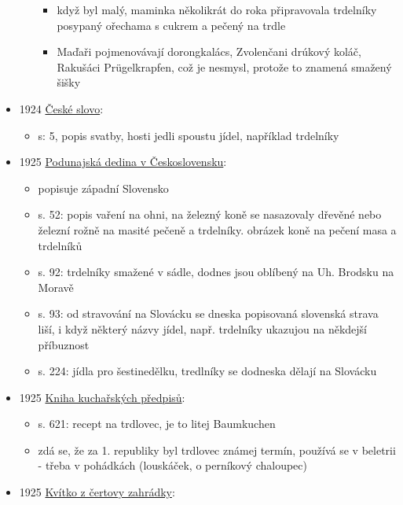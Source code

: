 \begin{itemize}
\begin{itemize}
    \begin{itemize}
    \tightlist
    \item
      když byl malý, maminka několikrát do roka připravovala trdelníky
      posypaný ořechama s cukrem a pečený na trdle
    \item
      Maďaři pojmenovávají dorongkalács, Zvolenčani drúkový koláč,
      Rakušáci Prügelkrapfen, což je nesmysl, protože to znamená smažený
      šišky
    \end{itemize}
  \end{itemize}
\item
  1924
  \href{https://ceskadigitalniknihovna.cz/uuid/uuid:a382bc3a-7825-4663-992a-f6e93b38a656}{České
  slovo}:

  \begin{itemize}
  \tightlist
  \item
    s: 5, popis svatby, hosti jedli spoustu jídel, například trdelníky
  \end{itemize}
\item
  1925
  \href{https://www.digitalniknihovna.cz/nulk/uuid/uuid:b2d75327-ce5f-4248-8ec5-52b0f9b2f9af}{Podunajská
  dedina v Československu}:

  \begin{itemize}
  \tightlist
  \item
    popisuje západní Slovensko
  \item
    s. 52: popis vaření na ohni, na železný koně se nasazovaly dřevěné
    nebo železní rožně na masité pečeně a trdelníky. obrázek koně na
    pečení masa a trdelníků
  \item
    s. 92: trdelníky smažené v sádle, dodnes jsou oblíbený na Uh.
    Brodsku na Moravě
  \item
    s. 93: od stravování na Slovácku se dneska popisovaná slovenská
    strava liší, i když některý názvy jídel, např. trdelníky ukazujou na
    někdejší příbuznost
  \item
    s. 224: jídla pro šestinedělku, tredlníky se dodneska dělají na
    Slovácku
  \end{itemize}
\item
  1925
  \href{https://ceskadigitalniknihovna.cz/uuid/uuid:fc3b3470-0163-11ea-af21-005056827e52}{Kniha
  kuchařských předpisů}:

  \begin{itemize}
  \tightlist
  \item
    s. 621: recept na trdlovec, je to litej Baumkuchen
  \item
    zdá se, že za 1. republiky byl trdlovec známej termín, používá se v
    beletrii - třeba v pohádkách (louskáček, o perníkový chaloupec)
  \end{itemize}
\item
  1925
  \href{https://ceskadigitalniknihovna.cz/uuid/uuid:f9d7dc50-c0ec-4cbb-ace5-c60d24598488}{Kvítko
  z čertovy zahrádky}:


\end{itemize}
